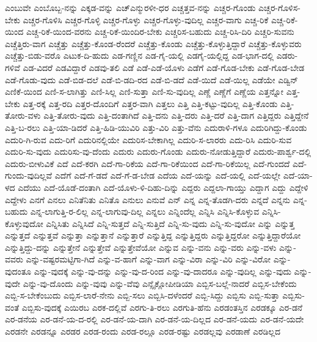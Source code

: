 {ಎಂಬುವೇ
ಎಂಬೊಬ್ಬ-ನನ್ನು
ಎಕ್ಕಡ-ವನ್ನು
ಎಚ್ಎನ್ಮುರಳೀ-ಧರ
ಎಚ್ಚತ್ತವ-ನನ್ನು
ಎಚ್ಚರ-ಗೊಂಡು
ಎಚ್ಚರ-ಗೊಳಿಸ-ಬೇಕು
ಎಚ್ಚರ-ಗೊಳಿಸಿ
ಎಚ್ಚರ-ಗೊಳ್ಳಿ
ಎಚ್ಚರ-ಗೊಳ್ಳು
ಎಚ್ಚರ-ಗೊಳ್ಳು-ವುದಿಲ್ಲ
ಎಚ್ಚರ-ವಾಗು
ಎಚ್ಚ-ರಿಕೆ
ಎಚ್ಚ-ರಿಕೆ-ಯಿಂದ
ಎಚ್ಚ-ರಿಕೆ-ಯಿಂದ-ವರನು
ಎಚ್ಚ-ರಿಕೆ-ಯಿಂದಿರ-ಬೇಕು
ಎಚ್ಚರಿಸ-ಬಹುದು
ಎಚ್ಚ-ರಿಸಿ-ದಿರಿ
ಎಚ್ಚರಿ-ಸುವನು
ಎಚ್ಚೆತ್ತಿರು-ವಾಗ
ಎಚ್ಚೆತ್ತು
ಎಚ್ಚೆತ್ತು-ಕೊಂಡ-ರೆಂದರೆ
ಎಚ್ಚೆತ್ತು-ಕೊಂಡು
ಎಚ್ಚೆತ್ತು-ಕೊಳ್ಳುತ್ತಿದ್ದಾರೆ
ಎಚ್ಚೆತ್ತು-ಕೊಳ್ಳುವರು
ಎಚ್ಚೆತ್ತು-ಬಿಡು-ವರೊ
ಎಟುಕ-ದಿ-ಹುದು
ಎಡ-ಗಣ್ಣಿನ
ಎಡ-ಗೈ-ಯಲ್ಲಿ
ಎಡಗೈ-ಯಲ್ಲಿದ್ದ
ಎಡ-ಭಾಗ-ದಲ್ಲಿ
ಎಡರು-ಗಳಿವೆ
ಎಡ-ವಿದರೆ
ಎಡವಿದ್ದಾರೆ
ಎಡವು-ತಲಿ
ಎಡೆ
ಎಡೆ-ಎಡೆ-ಯೊಳು
ಎಡೆಗೆ
ಎಡೆ-ಗೊಡ-ಬೇಕು
ಎಡೆ-ಗೊಡ-ಬೇಡ
ಎಡೆ-ಗೊಡು-ವುದು
ಎಡೆ-ಬಿಡ-ದಲೆ
ಎಡೆ-ಬಿ-ಡದಿ-ರದ
ಎಡೆ-ಬಿ-ಡದೆ
ಎಡೆ-ಯಿದೆ
ಎಡೆ-ಯಿಲ್ಲ
ಎಡೆಯೇ
ಎಡ್ವಿನ್
ಎಣಿಕೆ-ಯಿಂದ
ಎಣಿ-ಸ-ಲಾಗಿತ್ತು
ಎಣಿ-ಸಿಲ್ಲ
ಎಣಿ-ಸುತ್ತಾ
ಎಣಿ-ಸು-ವುದಿಲ್ಲ
ಎಣ್ಣೆ
ಎಣ್ಣೆಗೆ
ಎಣ್ಣೆಯ
ಎತ್ತನ್ನೋ
ಎತ್ತ-ಬೇಕು
ಎತ್ತ-ರಕ್ಕೆ
ಎತ್ತ-ರದಿ
ಎತ್ತರ-ದೊಂದಿಗೆ
ಎತ್ತರ-ವಾಗಿ
ಎತ್ತಲು
ಎತ್ತಿ
ಎತ್ತಿ-ಕಟ್ಟು-ವುದಿಲ್ಲ
ಎತ್ತಿ-ಕೊಂಡು
ಎತ್ತಿ-ತೋರು-ವಳು
ಎತ್ತಿ-ತೋರು-ವುದು
ಎತ್ತಿ-ದಂತಾಗಿದೆ
ಎತ್ತಿ-ದನು
ಎತ್ತಿ-ದರು
ಎತ್ತಿ-ದರೆ
ಎತ್ತಿ-ದಾಗ
ಎತ್ತಿದ್ದರು
ಎತ್ತಿದ್ದೇನೆ
ಎತ್ತಿ-ಬ-ರಲು
ಎತ್ತಿ-ಯಾ-ಡಿದರೆ
ಎತ್ತಿ-ಹಿಡಿ-ಯುವಿರಿ
ಎತ್ತು-ವಿರಿ
ಎತ್ತು-ವೆನು
ಎದುರಾಳಿ-ಗಳೂ
ಎದುರಿಗಿದ್ದು-ಕೊಂಡು
ಎದುರಿ-ಗಿ-ರುವ
ಎದು-ರಿಗೆ
ಎದುರಿನಲ್ಲಿಯೇ
ಎದುರಿಸ-ಬೇಕಾಗಿಲ್ಲ
ಎದುರಿ-ಸ-ಲಾರರು
ಎದು-ರಿಸಿ
ಎದುರಿ-ಸುವ
ಎದುರಿ-ಸು-ವುದು
ಎದುರಿಸು-ವು-ದೆಂದು
ಎದುರು
ಎದುರು-ಗೊಂಡು
ಎದುರು-ನೋಡುತ್ತಿದ್ದಾರೆ
ಎದುರು-ಪಾರ್ಶ್ವ-ದಲ್ಲಿ
ಎದುರು-ಬೀಳುವಿಕೆ
ಎದೆ
ಎದೆ-ಕರಗಿ
ಎದೆ-ಗಾ-ರಿಕೆಯ
ಎದೆ-ಗಾ-ರಿಕೆಯಿಂದ
ಎದೆ-ಗಾ-ರಿಕೆಯಿಲ್ಲ
ಎದೆ-ಗುಂದದೆ
ಎದೆ-ಗುಂದು-ವುದಿಲ್ಲವೆ
ಎದೆಗೆ
ಎದೆ-ಗೆ-ಡದೆ
ಎದೆ-ಗೆ-ಡ-ಬೇಡ
ಎದೆಯ
ಎದೆ-ಯನ್ನು
ಎದೆ-ಯಲ್ಲಿ
ಎದೆ-ಯಲ್ಲೇ
ಎದೆ-ಯಾ-ಳದ
ಎದೆಯು
ಎದೆ-ಯೊಡೆ-ದಂತಾಗಿ
ಎದೆ-ಯೊಳು-ಳಿ-ದಿಹು-ದಿನ್ನು
ಎದ್ದರು
ಎದ್ದಲಾ-ಗಾಯ್ತು
ಎದ್ದಾಗ
ಎದ್ದು
ಎದ್ದೇಳಿ
ಎದ್ದೇಳು
ಎನಗೆ
ಎನಲು
ಎನಿತೆನಿತು
ಎನಿತೊ
ಎನುಲು
ಎನುವೆ
ಎನ್
ಎನ್ನ
ಎನ್ನ-ತೊಡಗಿ-ದರು
ಎನ್ನದೆ
ಎನ್ನನು
ಎನ್ನ-ಬಹುದು
ಎನ್ನ-ಲಾಗುತ್ತಿ-ರ-ಲಿಲ್ಲ
ಎನ್ನ-ಲಾಗುವು-ದಿಲ್ಲ
ಎನ್ನಲು
ಎನ್ನಿಂದೆಲ್ಲ
ಎನ್ನಿಸಿ
ಎನ್ನಿಸಿ-ಕೊಳ್ಳುವ
ಎನ್ನಿಸಿ-ಕೊಳ್ಳುವುದೋ
ಎನ್ನಿಸಿತು
ಎನ್ನಿಸಿದೆ
ಎನ್ನಿ-ಸುತ್ತದೆ
ಎನ್ನಿ-ಸುತ್ತಿದೆ
ಎನ್ನಿ-ಸು-ವುದು
ಎನ್ನಿ-ಸು-ವುದೋ
ಎನ್ನು
ಎನ್ನುತ್ತ
ಎನ್ನುತ್ತದೆ
ಎನ್ನುತ್ತವೆ
ಎನ್ನುತ್ತಾ
ಎನ್ನುತ್ತಾನೆ
ಎನ್ನುತ್ತಾರೆ
ಎನ್ನುತ್ತಿದ್ದ
ಎನ್ನುತ್ತಿದ್ದರು
ಎನ್ನುತ್ತಿದ್ದರೋ
ಎನ್ನುತ್ತಿದ್ದಾರೆಯೋ
ಎನ್ನುತ್ತಿದ್ದು-ದನ್ನು
ಎನ್ನುತ್ತೇನೆ
ಎನ್ನುತ್ತೇವೆ
ಎನ್ನುತ್ತೇವೆಯೋ
ಎನ್ನುವ
ಎನ್ನು-ವನು
ಎನ್ನು-ವರು
ಎನ್ನು-ವಳು
ಎನ್ನು-ವವರು
ಎನ್ನು-ವಷ್ಟರಮಟ್ಟಿಗಾ-ಗಿದೆ
ಎನ್ನು-ವ-ಹಾಗೆ
ಎನ್ನು-ವಾಗ
ಎನ್ನು-ವಿರಾ
ಎನ್ನು-ವಿರಿ
ಎನ್ನು-ವಿರೋ
ಎನ್ನು-ವುದಂತೂ
ಎನ್ನು-ವುದಕ್ಕೆ
ಎನ್ನು-ವು-ದನ್ನು
ಎನ್ನು-ವು-ದ-ರಿಂದ
ಎನ್ನು-ವು-ದಾದರೂ
ಎನ್ನು-ವುದಿಲ್ಲ
ಎನ್ನು-ವುದು
ಎನ್ನು-ವುದೇ
ಎನ್ನು-ವು-ದೊಂದು
ಎನ್ನು-ವುವು
ಎನ್ನು-ವೆವು
ಎನ್ಸೈಕ್ಲೋಪೀಡಿಯಾ
ಎಬ್ಬಿಸ-ಬಲ್ಲೆ-ನಾದರೆ
ಎಬ್ಬಿಸ-ಬೇಕೆಂದು
ಎಬ್ಬಿ-ಸ-ಬೇಕೆಂಬುದು
ಎಬ್ಬಿಸ-ಲಾರೆ-ನೇನು
ಎಬ್ಬಿ-ಸಲು
ಎಬ್ಬಿಸಿ-ದಳೆಂದರೆ
ಎಬ್ಬಿ-ಸಿದ್ದು
ಎಬ್ಬಿಸು
ಎಬ್ಬಿ-ಸುತ್ತಾ
ಎಬ್ಬಿಸು-ವಂತೆ
ಎಬ್ಬಿಸು-ವುದಕ್ಕೆ
ಎಯಿರಬ
ಎರಕ-ದಲ್ಲಿವೆ
ಎರಗು-ತಿ-ರಲು
ಎರಗುತಿ-ಹೆನು
ಎರಡಂತಸ್ತಿನ
ಎರಡಕ್ಕೂ
ಎರ-ಡನೆ
ಎರ-ಡನೆಯ
ಎರ-ಡನೆ-ಯ-ದ-ರಲ್ಲಿ
ಎರ-ಡನೆ-ಯ-ದಾಗಿ
ಎರ-ಡನೆ-ಯ-ದಿಲ್ಲದ
ಎರ-ಡನೆ-ಯದು
ಎರ-ಡನೆ-ಯದೇ
ಎರಡನೇ
ಎರಡನ್ನೂ
ಎರಡರ
ಎರಡ-ರಂದು
ಎರಡ-ರಲ್ಲೂ
ಎರಡ-ರಷ್ಟು
ಎರಡಲ್ಲವು
ಎರಡಾಣೆ
ಎರಡಿಲ್ಲದ
}
